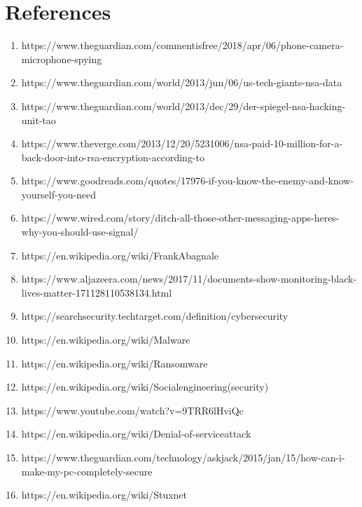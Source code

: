 \documentclass{article}
\begin{document}
\section{References}
\begin{enumerate}
\item https://www.theguardian.com/commentisfree/2018/apr/06/phone-camera-microphone-spying
\item https://www.theguardian.com/world/2013/jun/06/us-tech-giants-nsa-data
\item https://www.theguardian.com/world/2013/dec/29/der-spiegel-nsa-hacking-unit-tao
\item https://www.theverge.com/2013/12/20/5231006/nsa-paid-10-million-for-a-back-door-into-rsa-encryption-according-to
\item https://www.goodreads.com/quotes/17976-if-you-know-the-enemy-and-know-yourself-you-need
\item https://www.wired.com/story/ditch-all-those-other-messaging-apps-heres-why-you-should-use-signal/
\item https://en.wikipedia.org/wiki/FrankAbagnale
\item https://www.aljazeera.com/news/2017/11/documents-show-monitoring-black-lives-matter-171128110538134.html
\item https://searchsecurity.techtarget.com/definition/cybersecurity
\item https://en.wikipedia.org/wiki/Malware
\item https://en.wikipedia.org/wiki/Ransomware
\item https://en.wikipedia.org/wiki/Socialengineering(security)
\item https://www.youtube.com/watch?v=9TRR6lHviQc
\item https://en.wikipedia.org/wiki/Denial-of-serviceattack
\item https://www.theguardian.com/technology/askjack/2015/jan/15/how-can-i-make-my-pc-completely-secure
\item https://en.wikipedia.org/wiki/Stuxnet
\end{enumerate}
\end{document}
